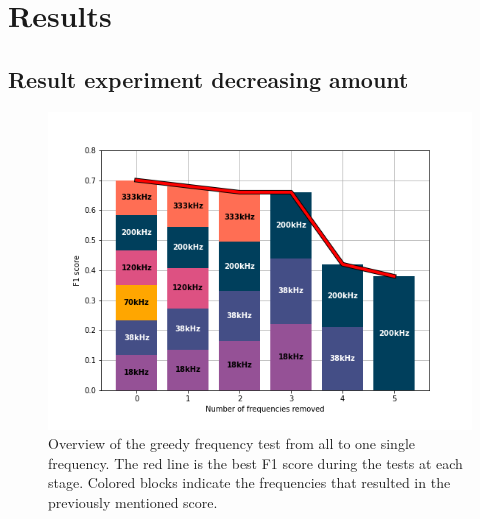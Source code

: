 \clearpage
\chapter{Results}
\section{Result experiment decreasing amount}
    \clearpage
    \begin{figure}[H]
        \centering
        \includegraphics[scale=0.8]{figures/ta_vekk_frekvenser.png}
        \caption{Overview of the greedy frequency test from all to one single frequency. The red line is the best F1 score during the tests at each stage. Colored blocks indicate the frequencies that resulted in the previously mentioned score.}
      	\medskip 
        \label{decrease_amount_fig}
    \end{figure}

